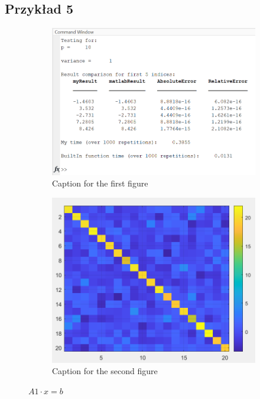 \documentclass{article}
\begin{document}
    \subsection*{Przykład 5}
    \vspace{12pt}
    \begin{figure}[hbt!]
        \centering

        \begin{subfigure}{0.45\linewidth}
            \includegraphics[width=\linewidth]{img/fig5.png}
            \caption{Caption for the first figure}
        \end{subfigure}
        \hfill
        \begin{subfigure}{0.45\linewidth}
            \includegraphics[width=\linewidth]{img/mat5.png}
            \caption{Caption for the second figure}
        \end{subfigure}

        \caption{$A1 \cdot x = b$}
        \label{fig:example5}
    \end{figure}
    
\end{document}
